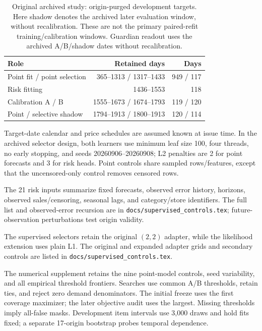 \begin{table}[htbp]
\centering\small
\caption{Original archived study: origin-purged development targets. Here shadow denotes the archived later evaluation window, without recalibration. These are not the primary paired-refit training/calibration windows. Guardian readout uses the archived A/B/shadow dates without recalibration.}
\label{tab:chronology}
\begin{tabular}{lrr}\toprule
Role & Retained days & Days\\\midrule
Point fit / point selection & 365--1313 / 1317--1433 & 949 / 117\\
Risk fitting & 1436--1553 & 118\\
Calibration A / B & 1555--1673 / 1674--1793 & 119 / 120\\
Point / selective shadow & 1794--1913 / 1800--1913 & 120 / 114\\
\bottomrule\end{tabular}
\end{table}
Target-date calendar and price schedules are assumed known at issue time. In the archived selector design, both learners use minimum leaf size 100, four threads, no early stopping, and seeds 20260906--20260908; L2 penalties are 2 for point forecasts and 3 for risk heads. Point controls share sampled rows/features, except that the uncensored-only control removes censored rows.

The 21 risk inputs summarize fixed forecasts, observed error history, horizons, observed sales/censoring, seasonal lags, and category/store identifiers. The full list and observed-error recursion are in \texttt{docs/supervised\_controls.tex}; future-observation perturbations test origin validity.

The supervised selectors retain the original $(2,2)$ adapter, while the likelihood extension uses plain L1. The original and expanded adapter grids and secondary controls are listed in \texttt{docs/supervised\_controls.tex}.

The numerical supplement retains the nine point-model controls, seed variability, and all empirical threshold frontiers. Searches use common A/B thresholds, retain ties, and reject zero demand denominators. The initial freeze uses the first coverage maximizer; the later objective audit uses the largest. Missing thresholds imply all-false masks. Development item intervals use 3,000 draws and hold fits fixed; a separate 17-origin bootstrap probes temporal dependence.
